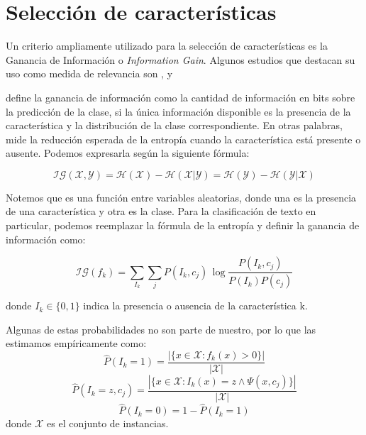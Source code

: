 
\section{Selección de características}\label{instance-selection}

Un criterio ampliamente utilizado para la selección de características es la Ganancia de Información o \textit{Information Gain}. Algunos estudios que destacan su uso como medida de relevancia son \citet{dualist}, \citet{forman-ig} y \citet{Sebastiani-text-categorization}

\citet{infgain} define la ganancia de información como la cantidad de información en bits sobre la predicción de la clase, si la única información disponible es la presencia de la característica y la distribución de la clase correspondiente. En otras palabras, mide la reducción esperada de la entropía cuando la característica está presente o ausente. Podemos expresarla según la siguiente fórmula:

\begin{equation}
\mathcal{IG}(\mathcal{X}, \mathcal{Y}) = \mathcal{H}(\mathcal{X}) - \mathcal{H}(\mathcal{X}|\mathcal{Y}) = \mathcal{H}(\mathcal{Y}) - \mathcal{H}(\mathcal{Y}|\mathcal{X})
\end{equation}

Notemos que es una función entre variables aleatorias, donde una es la presencia de una característica y otra es la clase. Para la clasificación de texto en particular, podemos reemplazar la fórmula de la entropía y definir la ganancia de información como:

\begin{equation}
\mathcal{IG}(f_k) = \sum_{I_k} \sum_j P(I_k, c_j)\,\log \frac{P(I_k,c_j)}{P(I_k)P(c_j)}
\end{equation}

donde $I_k \in \{0, 1\}$ indica la presencia o ausencia de la característica k.

Algunas de estas probabilidades no son parte de nuestro, por lo que las estimamos empíricamente como:
$$ \hat{P}(I_k = 1) = \frac{|\{ x \in \mathcal{X}: f_k(x) > 0 \} |}{|\mathcal{X}|} $$
$$ \hat{P}(I_k = z, c_j) = \frac{|\{ x \in \mathcal{X}: I_k(x) = z \wedge \Psi(x, c_j)\} |}{|\mathcal{X}|} $$
$$ \hat{P}(I_k = 0) = 1 - \hat{P}(I_k = 1) $$
donde $\mathcal{X}$ es el conjunto de instancias.

